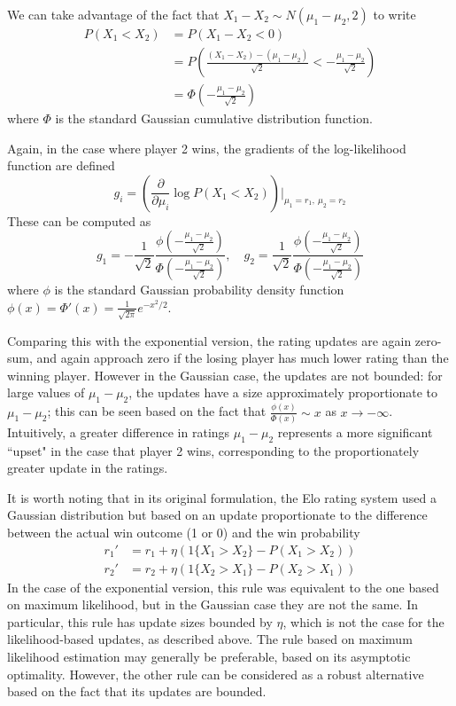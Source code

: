 \documentclass{article}
\begin{document}
	We can take advantage of the fact that $X_1 - X_2 \sim N(\mu_1 - \mu_2, 2)$ to write
	\begin{align*}
	P(X_1 < X_2) &= P(X_1 - X_2 < 0) \\
	&= P\left(\frac{(X_1 - X_2) - (\mu_1 - \mu_2)}{\sqrt 2} < -\frac{\mu_1 - \mu_2}{\sqrt 2}\right) \\
	&= \Phi\left(-\frac{\mu_1 - \mu_2}{\sqrt 2}\right)
	\end{align*}
	where $\Phi$ is the standard Gaussian cumulative distribution function.
	
	Again, in the case where player 2 wins, the gradients of the log-likelihood function are defined 
	$$g_i = \left(\frac{\partial}{\partial \mu_i} \log P(X_1 < X_2)\right) \bigg|_{\mu_1=r_1,\ \mu_2=r_2}$$
	These can be computed as
	$$
	g_1 = -\frac1{\sqrt 2}\frac{\phi\left(-\frac{\mu_1 - \mu_2}{\sqrt 2}\right)}{\Phi\left(-\frac{\mu_1 - \mu_2}{\sqrt 2}\right)},\quad
	g_2 = \frac1{\sqrt 2}\frac{\phi\left(-\frac{\mu_1 - \mu_2}{\sqrt 2}\right)}{\Phi\left(-\frac{\mu_1 - \mu_2}{\sqrt 2}\right)}
	$$
	where $\phi$ is the standard Gaussian probability density function $\phi(x) = \Phi'(x) = \frac1{\sqrt{2\pi}}e^{-x^2/2}$.

	Comparing this with the exponential version, the rating updates are again zero-sum, and again approach zero if the losing player
	has much lower rating than the winning player. However in the Gaussian case, the updates are not bounded: for large values of $\mu_1 - \mu_2$,
	the updates have a size approximately proportionate to $\mu_1 - \mu_2$; this can be seen based on the fact that
	$\frac{\phi(x)}{\Phi(x)} \sim x$ as $x \to -\infty$. Intuitively, a greater difference in ratings $\mu_1 - \mu_2$ represents
	a more significant ``upset" in the case that player 2 wins, corresponding to the proportionately greater update in the ratings.
	
	It is worth noting that in its original formulation, the Elo rating system used a Gaussian distribution but based on an update
	proportionate to the difference between the actual win outcome (1 or 0) and the win probability
	\begin{align*}
	r_1' &= r_1 + \eta(1\{X_1 > X_2\} - P(X_1 > X_2)) \\
	r_2' &= r_2 + \eta(1\{X_2 > X_1\} - P(X_2 > X_1))
	\end{align*}
	In the case of the exponential version, this rule was equivalent to the one based on maximum likelihood, but in the Gaussian case
	they are not the same. In particular, this rule has update sizes bounded by $\eta$, which is not the case for the likelihood-based
	updates, as described above. The rule based on maximum likelihood estimation may generally be preferable, based on its asymptotic
	optimality. However, the other rule can be considered as a robust alternative based on the fact that its updates are bounded.
\end{document}
